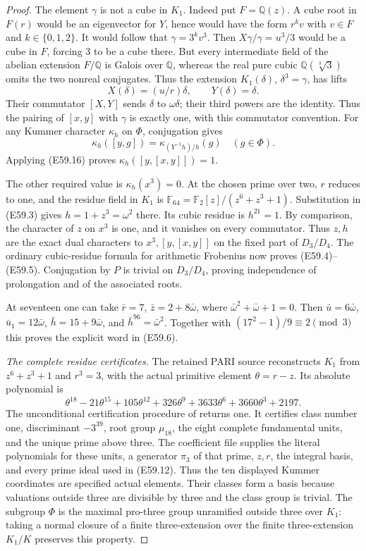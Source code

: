 \begin{proof}
The element $\gamma$ is not a cube in $K_1$.
Indeed put $F=\mathbb Q(z)$. A cube root
in $F(r)$ would be an eigenvector for
$Y$, hence would have the form $r^k v$
with $v\in F$ and $k\in\{0,1,2\}$.
It would follow that $\gamma=3^k v^3$.
Then $X\gamma/\gamma=u^3/3$ would be
a cube in $F$, forcing $3$ to be a
cube there. But every intermediate
field of the abelian extension
$F/\mathbb Q$ is Galois over
$\mathbb Q$, whereas the real pure
cubic $\mathbb Q(\sqrt[3]{3})$
omits the two nonreal conjugates.
Thus the extension $K_1(\delta)$,
$\delta^3=\gamma$, has lifts
\[
 X(\delta)=(u/r)\delta,\qquad
 Y(\delta)=\delta .
 \tag{E59.18}
\]
Their commutator $[X,Y]$ sends
$\delta$ to $\omega\delta$; their
third powers are the identity.
Thus the pairing of $[x,y]$ with
$\gamma$ is exactly one, with this
commutator convention. For any Kummer
character $\kappa_h$ on $\Phi$,
conjugation gives
\[
 \kappa_h([y,g])
       =\kappa_{(Y^{-1}h)/h}(g)
             \quad(g\in\Phi).
 \tag{E59.19}
\]
Applying (E59.16) proves
$\kappa_h([y,[x,y]])=1$.

The other required value is
$\kappa_h(x^3)=0$.
At the chosen prime over two, $r$ reduces
to one, and the residue field in $K_1$
is $\mathbb F_{64}=\mathbb F_2[z]/(z^6+z^3+1)$.
Substitution in (E59.3) gives
$h=1+z^3=\omega^2$ there.
Its cubic residue is $h^{21}=1$.
By comparison, the character of $z$
on $x^3$ is one, and it vanishes on
every commutator. Thus $z,h$ are the
exact dual characters to
$x^3,[y,[x,y]]$ on the fixed part
of $D_3/D_4$.
The ordinary cubic-residue formula for
arithmetic Frobenius now proves
(E59.4)--(E59.5).
Conjugation by $P$ is trivial on
$D_3/D_4$, proving independence of
prolongation and of the associated roots.

At seventeen one can take
$\bar r=7$, $\bar z=2+8\bar\omega$,
where $\bar\omega^2+\bar\omega+1=0$.
Then $\bar u=6\bar\omega$,
$\bar u_1=12\bar\omega$,
$\bar h=15+9\bar\omega$, and
$\bar h^{96}=\bar\omega^2$.
Together with $(17^2-1)/9\equiv2\pmod3$
this proves the explicit word in (E59.6).

\emph{The complete residue certificates.}
The retained PARI source reconstructs
$K_1$ from $z^6+z^3+1$ and $r^3=3$,
with the actual primitive element
$\theta=r-z$. Its absolute polynomial is
\[
 \theta^{18}-21\theta^{15}+105\theta^{12}
 +326\theta^9+3633\theta^6+3660\theta^3+2197.
 \tag{E59.20}
\]
The unconditional certification procedure
of \cite{E_PARICertifiedUnits} returns one.
It certifies class number one, discriminant
$-3^{39}$, root group $\mu_{18}$, the
eight complete fundamental units, and
the unique prime above three.
The coefficient file supplies the literal
polynomials for these units, a generator
$\pi_3$ of that prime, $z,r$, the integral
basis, and every prime ideal used in
(E59.12). Thus the ten displayed
Kummer coordinates are specified actual
elements. Their classes form a basis
because valuations outside three are
divisible by three and the class group
is trivial. The subgroup $\Phi$ is the
maximal pro-three group unramified
outside three over $K_1$: taking a
normal closure of a finite three-extension
over the finite three-extension $K_1/K$
preserves this property.


\end{proof}
